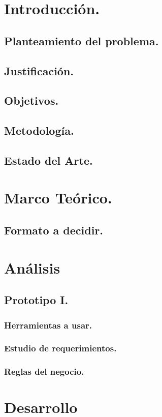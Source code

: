 \documentclass[12pt, a4paper, titlepage]{article}
\begin{document}
	\section{Introducción.}
		\subsection{Planteamiento del problema.}
		\subsection{Justificación.}
		\subsection{Objetivos.}
		\subsection{Metodología.}
		\subsection{Estado del Arte.}
	\newpage
	\section{Marco Teórico.}
		\subsection{Formato a decidir.}
	\newpage
	\section{Análisis}
		\subsection{Prototipo I.}
			\subsubsection{Herramientas a usar.}
			\subsubsection{Estudio de requerimientos.}
			\subsubsection{Reglas del negocio.}
	\newpage
	\section{Desarrollo}
\end{document}
